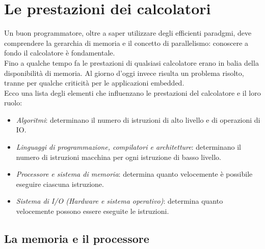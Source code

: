 \section{Le prestazioni dei calcolatori}
Un buon programmatore, oltre a saper utilizzare degli efficienti paradgmi, deve comprendere la gerarchia di memoria e il concetto di parallelismo: conoscere a fondo il calcolatore è fondamentale.\\
Fino a qualche tempo fa le prestazioni di qualsiasi calcolatore erano in balia della disponibilità di memoria. Al giorno d'oggi invece risulta un problema risolto, tranne per qualche criticità per le applicazioni embedded.\\
Ecco una lista degli elementi che influenzano le prestazioni del calcolatore e il loro ruolo:
\begin{itemize}[noitemsep, nolistsep]
	\item \textit{Algoritmi}: determinano il numero di istruzioni di alto livello e di operazioni di IO.
	\item \textit{Linguaggi di programmazione, compilatori e architetture}: determinano il numero di istruzioni macchina per ogni istruzione di basso livello.
	\item \textit{Processore e sistema di memoria}: determina quanto velocemente è possibile eseguire ciascuna istruzione.
	\item \textit{Sistema di I/O (Hardware e sistema operativo)}: determina quanto velocemente possono essere eseguite le istruzioni.
\end{itemize}

\subsection{La memoria e il processore}
